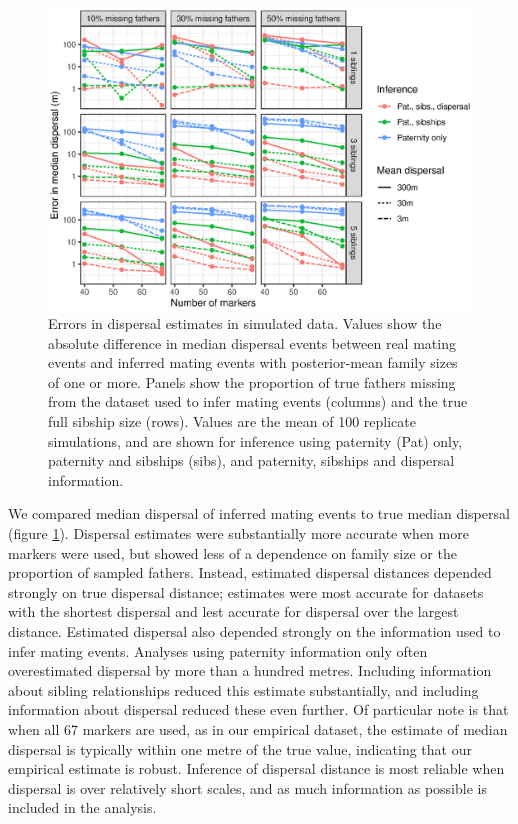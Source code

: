 \documentclass[10pt, a4paper, twocolumn]{article} %
\begin{document}
\begin{figure}
    \centering
    \includegraphics{fig-sim_dipsersal.eps}
    \caption{
        Errors in dispersal estimates in simulated data.
        Values show the absolute difference in median dispersal events between real mating events and inferred mating events with posterior-mean family sizes of one or more.
        Panels show the proportion of true fathers missing from the dataset used to infer mating events (columns) and the true full sibship size (rows).
        Values are the mean of 100 replicate simulations, and are shown for inference using paternity (Pat) only, paternity and sibships (sibs), and paternity, sibships and dispersal information.
    }
    \label{fig:sim-dispersal}
\end{figure}

We compared median dispersal of inferred mating events to true median dispersal (figure \ref{fig:sim-dispersal}).
Dispersal estimates were substantially more accurate when more markers were used, but showed less of a dependence on family size or the proportion of sampled fathers.
Instead, estimated dispersal distances depended strongly on true dispersal distance; estimates were most accurate for datasets with the shortest dispersal and lest accurate for dispersal over the largest distance.
Estimated dispersal also depended strongly on the information used to infer mating events.
Analyses using paternity information only often overestimated dispersal by more than a hundred metres.
Including information about sibling relationships reduced this estimate substantially, and including information about dispersal reduced these even further.
Of particular note is that when all 67 markers are used, as in our empirical dataset, the estimate of median dispersal is typically within one metre of the true value, indicating that our empirical estimate is robust.
Inference of dispersal distance is most reliable when dispersal is over relatively short scales, and as much information as possible is included in the analysis.
\end{document}
